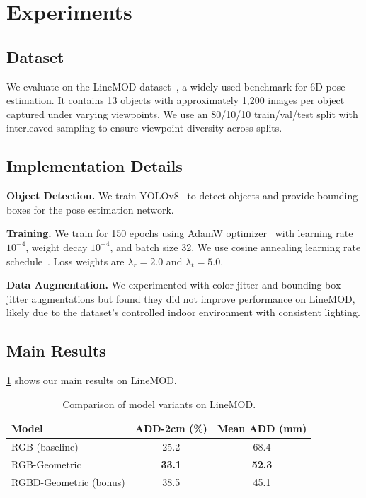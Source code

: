 \section{Experiments}
\label{sec:experiments}

\subsection{Dataset}
We evaluate on the LineMOD dataset~\cite{hinterstoisser2012model}, a widely used benchmark for 6D pose estimation. It contains 13 objects with approximately 1,200 images per object captured under varying viewpoints. We use an 80/10/10 train/val/test split with interleaved sampling to ensure viewpoint diversity across splits.

\subsection{Implementation Details}
\textbf{Object Detection.} We train YOLOv8~\cite{yolov8} to detect objects and provide bounding boxes for the pose estimation network.

\textbf{Training.} We train for 150 epochs using AdamW optimizer~\cite{loshchilov2019adamw} with learning rate $10^{-4}$, weight decay $10^{-4}$, and batch size 32. We use cosine annealing learning rate schedule~\cite{loshchilov2017sgdr}. Loss weights are $\lambda_r = 2.0$ and $\lambda_t = 5.0$.

\textbf{Data Augmentation.} We experimented with color jitter and bounding box jitter augmentations but found they did not improve performance on LineMOD, likely due to the dataset's controlled indoor environment with consistent lighting.

\subsection{Main Results}

\cref{tab:main_results} shows our main results on LineMOD.

\begin{table}[h]
\centering
\caption{Comparison of model variants on LineMOD.}
\label{tab:main_results}
\begin{tabular}{lcc}
\toprule
Model & ADD-2cm (\%) & Mean ADD (mm) \\
\midrule
RGB (baseline) & 25.2 & 68.4 \\
RGB-Geometric & \textbf{33.1} & \textbf{52.3} \\
\midrule
RGBD-Geometric (bonus) & 38.5 & 45.1 \\
\bottomrule
\end{tabular}
\end{table}

